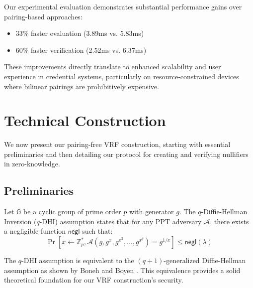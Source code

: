Our experimental evaluation demonstrates substantial performance gains over pairing-based approaches:
\begin{itemize}
    \item 33\% faster evaluation (3.89ms vs. 5.83ms)
    \item 60\% faster verification (2.52ms vs. 6.37ms)
\end{itemize}

These improvements directly translate to enhanced scalability and user experience in credential systems, particularly on resource-constrained devices where bilinear pairings are prohibitively expensive.













\section{Technical Construction}

We now present our pairing-free VRF construction, starting with essential preliminaries and then detailing our protocol for creating and verifying nullifiers in zero-knowledge.

\subsection{Preliminaries}

\begin{definition}
Let $\mathbb{G}$ be a cyclic group of prime order $p$ with generator $g$. The $q$-Diffie-Hellman Inversion ($q$-DHI) assumption states that for any PPT adversary $\mathcal{A}$, there exists a negligible function $\mathsf{negl}$ such that:
\[
\Pr\left[x \leftarrow \mathbb{Z}_p^*, \mathcal{A}(g, g^x, g^{x^2}, \ldots, g^{x^q}) = g^{1/x}\right] \leq \mathsf{negl}(\lambda)
\]
\end{definition}

\begin{remark}
The $q$-DHI assumption is equivalent to the $(q+1)$-generalized Diffie-Hellman assumption as shown by Boneh and Boyen \cite{BB04}. This equivalence provides a solid theoretical foundation for our VRF construction's security.
\end{remark}

